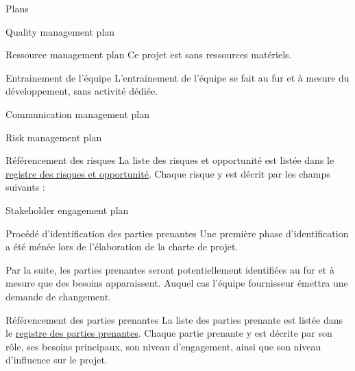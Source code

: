 \documentclass[]{article}
\begin{document}
\begin{section}{Plans}
 \begin{subsection}{Quality management plan}

 \end{subsection}

 \begin{subsection}{Ressource management plan}
     Ce projet est sans ressources matériels.

     \begin{subsubsection}{Entrainement de l'équipe}
         L'entrainement de l'équipe se fait au fur et à mesure du développement, sans activité dédiée.
     \end{subsubsection}


 \end{subsection}

 \begin{subsection}{Communication management plan}

 \end{subsection}

 \begin{subsection}{Risk management plan}
    \begin{subsubsection}{Référencement des risques}
        La liste des risques et opportunité est listée dans le \href{./documents/risques.pdf}{registre des risques et opportunité}.
        Chaque risque y est décrit par les champs suivants : 
    \end{subsubsection}
 \end{subsection}

 \begin{subsection}{Stakeholder engagement plan}

     \begin{subsubsection}{Procédé d'identification des parties prenantes}
         Une première phase d'identification a été ménée lors de l'élaboration de la charte de projet.

         Par la suite, les parties prenantes seront potentiellement identifiées au fur et à mesure que des besoins apparaissent. Auquel cas l'équipe fournisseur émettra une demande de changement.
     \end{subsubsection}

     \begin{subsubsection}{Référencement des parties prenantes}
         La liste des parties prenante est listée dans le \href{./documents/Registre_des_parties_prenantes.pdf}{registre des parties prenantes}.
         Chaque partie prenante y est décrite par son rôle, ses besoins principaux, son niveau d'engagement, ainsi que son niveau d'influence sur le projet.


\end{subsubsection}
\end{subsection}
\end{section}
\end{document}
